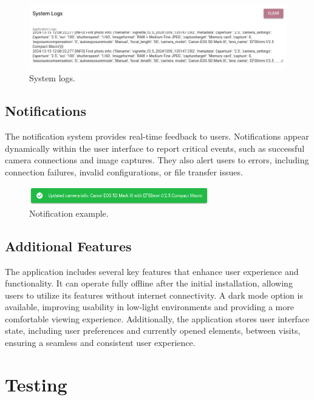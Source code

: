 \begin{figure}[h]
\centering
\includegraphics[width=1\textwidth]{Images/system_logs.png}
\caption{System logs.}
\label{fig:ui_system_logs}
\end{figure}

\subsection{Notifications}

The notification system provides real-time feedback to users. Notifications appear dynamically within the user interface to report critical events, such as successful camera connections and image captures. They also alert users to errors, including connection failures, invalid configurations, or file transfer issues.

\begin{figure}[h]
\centering
\includegraphics[width=0.7\textwidth]{Images/notification.png}
\caption{Notification example.}
\label{fig:ui_notification}
\end{figure}

\subsection{Additional Features}

The application includes several key features that enhance user experience and functionality. It can operate fully offline after the initial installation, allowing users to utilize its features without internet connectivity. A dark mode option is available, improving usability in low-light environments and providing a more comfortable viewing experience. Additionally, the application stores user interface state, including user preferences and currently opened elements, between visits, ensuring a seamless and consistent user experience.

\section{Testing}

